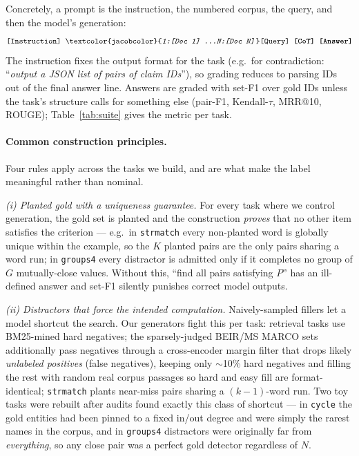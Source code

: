 Concretely, a prompt is the instruction, the numbered corpus, the query, and then the model's generation:
{\small$${\texttt{[Instruction] \textcolor{jacobcolor}{\textit{1:[Doc 1] \ldots N:[Doc N]}} [Query] \textbf{[CoT] [Answer]}}}$$}
The instruction fixes the output format for the task (e.g.\ for contradiction: ``\emph{output a JSON list of pairs of claim IDs}''), so grading reduces to parsing IDs out of the final answer line. Answers are graded with set-F1 over gold IDs unless the task's structure calls for something else (pair-F1, Kendall-$\tau$, MRR@10, ROUGE); Table~\ref{tab:suite} gives the metric per task.

\paragraph{Common construction principles.} Four rules apply across the tasks we build, and are what make the \cname label meaningful rather than nominal.

\emph{(i) Planted gold with a uniqueness guarantee.} For every task where we control generation, the gold set is planted and the construction \emph{proves} that no other item satisfies the criterion --- e.g.\ in \texttt{strmatch} every non-planted word is globally unique within the example, so the $K$ planted pairs are the only pairs sharing a word run; in \texttt{groups4} every distractor is admitted only if it completes no group of $G$ mutually-close values. Without this, ``find all pairs satisfying $P$'' has an ill-defined answer and set-F1 silently punishes correct model outputs.

\emph{(ii) Distractors that force the intended computation.} Naively-sampled fillers let a model shortcut the search. Our generators fight this per task: retrieval tasks use BM25-mined hard negatives; the sparsely-judged BEIR/MS MARCO sets additionally pass negatives through a cross-encoder margin filter that drops likely \emph{unlabeled positives} (false negatives), keeping only $\sim$10\% hard negatives and filling the rest with random real corpus passages so hard and easy fill are format-identical; \texttt{strmatch} plants near-miss pairs sharing a $(k{-}1)$-word run. Two toy tasks were rebuilt after audits found exactly this class of shortcut --- in \texttt{cycle} the gold entities had been pinned to a fixed in/out degree and were simply the rarest names in the corpus, and in \texttt{groups4} distractors were originally far from \emph{everything}, so any close pair was a perfect gold detector regardless of $N$.

